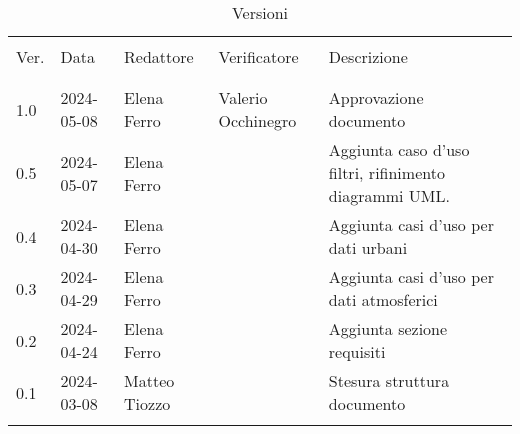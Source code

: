 \documentclass[12pt]{article}
\begin{document}


\newpage



\captionsetup[table]{list=no}
\begin{table}[!h]
	\footnotesize
	\begin{center}
		\caption*{Versioni}
		\vspace{0.5cm}
		\begin{tabular}{ l l l l p{6.1cm} }
			\hline                                                                                                          \\[-2ex]
			Ver. & Data       & Redattore     & Verificatore       & Descrizione                                            \\
			\\[-2ex] \hline \\[-1.5ex]
			1.0  & 2024-05-08 & Elena Ferro   & Valerio Occhinegro & Approvazione documento                                 \\
			0.5  & 2024-05-07 & Elena Ferro   &                    & Aggiunta caso d'uso filtri, rifinimento diagrammi UML. \\
			0.4  & 2024-04-30 & Elena Ferro   &                    & Aggiunta casi d'uso per dati urbani                    \\
			0.3  & 2024-04-29 & Elena Ferro   &                    & Aggiunta casi d'uso per dati atmosferici               \\
			0.2  & 2024-04-24 & Elena Ferro   &                    & Aggiunta sezione requisiti                             \\
			0.1  & 2024-03-08 & Matteo Tiozzo &                    & Stesura struttura documento                            \\
			\\[-1.5ex] \hline
		\end{tabular}
	\end{center}
\end{table}
\captionsetup[table]{list=yes}

\newpage

\tableofcontents
\listoftables
\listoffigures

\newpage








\end{document}
